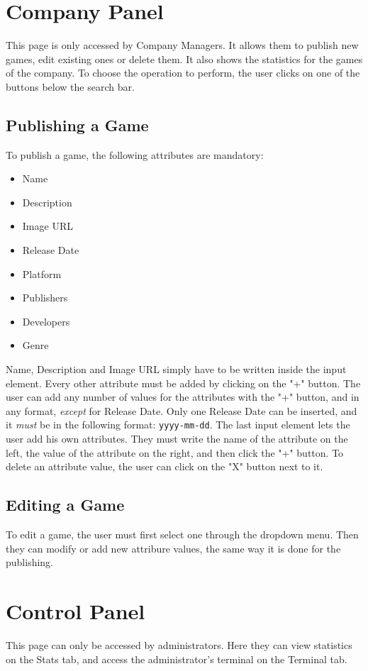 \section{Company Panel}
This page is only accessed by Company Managers. It allows them to publish new games, edit existing ones or delete them. It also shows the statistics for the games of the company. To choose the operation to perform, the user clicks on one of the buttons below the search bar.
\subsection{Publishing a Game}
To publish a game, the following attributes are mandatory:
\begin{itemize}
    \item Name
    \item Description
    \item Image URL
    \item Release Date
    \item Platform
    \item Publishers
    \item Developers
    \item Genre
\end{itemize}
Name, Description and Image URL simply have to be written inside the input element. Every other attribute must be added by clicking on the "+" button.
The user can add any number of values for the attributes with the "+" button, and in any format, \emph{except} for Release Date. Only one Release Date can be inserted, and it \emph{must} be in the following format: \texttt{yyyy-mm-dd}.
The last input element lets the user add his own attributes. They must write the name of the attribute on the left, the value of the attribute on the right, and then click the "+" button.
To delete an attribute value, the user can click on the "X" button next to it.
\subsection{Editing a Game}
To edit a game, the user must first select one through the dropdown menu.
Then they can modify or add new attribure values, the same way it is done for the publishing.
\section{Control Panel}
This page can only be accessed by administrators. Here they can view statistics on the Stats tab, and access the administrator's terminal on the Terminal tab.
